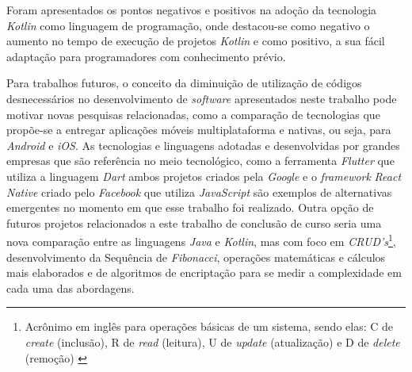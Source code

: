 Foram apresentados os pontos negativos e positivos na adoção da tecnologia \textit{Kotlin} como linguagem de programação, onde destacou-se como negativo o aumento no tempo de execução de projetos \textit{Kotlin} e como positivo, a sua fácil adaptação para programadores com conhecimento prévio.

Para trabalhos futuros, o conceito da diminuição de utilização de códigos desnecessários no desenvolvimento de \textit{software} apresentados neste trabalho pode motivar novas pesquisas relacionadas, como a comparação de tecnologias que propõe-se a entregar aplicações móveis multiplataforma e nativas, ou seja, para \textit{Android} e \textit{iOS}. As tecnologias e linguagens adotadas e desenvolvidas por grandes empresas que são referência no meio tecnológico, como a ferramenta \textit{Flutter} que utiliza a linguagem \textit{Dart} ambos projetos criados pela \textit{Google} e o \textit{framework} \textit{React Native} criado pelo \textit{Facebook} que utiliza \textit{JavaScript} são exemplos de alternativas emergentes no momento em que esse trabalho foi realizado. Outra opção de futuros projetos relacionados a este trabalho de conclusão de curso seria uma nova comparação entre as linguagens \textit{Java} e \textit{Kotlin}, mas com foco em \textit{CRUD's}\footnote[1]{Acrônimo em inglês para operações básicas de um sistema, sendo elas: C de  \textit{create} (inclusão), R de  \textit{read} (leitura), U de  \textit{update} (atualização) e D de  \textit{delete} (remoção) \cite{CRUD}}, desenvolvimento da Sequência de \textit{Fibonacci},  operações matemáticas e cálculos mais elaborados e de algoritmos de encriptação para se medir a complexidade em cada uma das abordagens.




